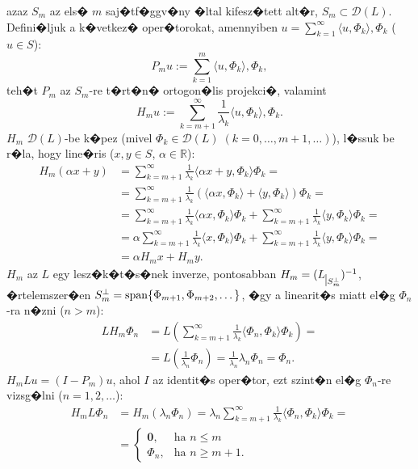 azaz $S_m$ az els� $m$ saj�tf�ggv�ny �ltal kifesz�tett alt�r, $S_m \subset \mathcal{D}(L)$. Defini�ljuk a k�vetkez� oper�torokat, amennyiben $u = \sum_{k = 1}^\infty \langle u, \Phi_k \rangle, \Phi_k$ ($u \in S$):
\begin{equation*}
P_m u := \sum_{k = 1}^m \langle u, \Phi_k \rangle, \Phi_k,
\end{equation*}
teh�t $P_m$ az $S_m$-re t�rt�n� ortogon�lis projekci�, valamint
\begin{equation*}
H_m u := \sum_{k = m + 1}^\infty \frac{1}{\lambda_k} \langle u, \Phi_k \rangle, \Phi_k.
\end{equation*}
$H_m$ $\mathcal{D}(L)$-be k�pez (mivel $\Phi_k \in \mathcal{D}(L) \; (k = 0, \dots, m+1, \dots)$), l�ssuk be r�la, hogy line�ris ($x, y \in S$, $\alpha \in \mathbb{R}$):
\begin{align*}
H_m(\alpha x + y) &= \sum_{k = m+1}^\infty \frac{1}{\lambda_k} \langle \alpha x + y, \Phi_k \rangle \Phi_k = \\
 &= \sum_{k = m+1}^\infty \frac{1}{\lambda_k} ( \langle \alpha x, \Phi_k \rangle + \langle y, \Phi_k \rangle ) \Phi_k = \\
 &= \sum_{k = m+1}^\infty \frac{1}{\lambda_k} \langle \alpha x, \Phi_k \rangle \Phi_k + \sum_{k = m+1}^\infty \frac{1}{\lambda_k} \langle y, \Phi_k \rangle \Phi_k = \\
 &= \alpha \sum_{k = m+1}^\infty \frac{1}{\lambda_k} \langle x, \Phi_k \rangle \Phi_k + \sum_{k = m+1}^\infty \frac{1}{\lambda_k} \langle y, \Phi_k \rangle \Phi_k = \\
 &= \alpha H_m x + H_m y.
\end{align*}
$H_m$ az $L$ egy lesz�k�t�s�nek inverze, pontosabban $H_m = (L_{\mkern 1mu \vrule height 2ex\mkern2mu S_m^\perp})^{-1}$, �rtelemszer�en $S_m^\perp = \mathop{\mathrm{span}} \{ \Phi_{m+1}, \Phi_{m+2}, \dots \}$, �gy a linearit�s miatt el�g $\Phi_n$-ra n�zni ($n > m$):
\begin{align*}
L H_m \Phi_n &= L \left( \sum_{k = m+1}^\infty \frac{1}{\lambda_k} \langle \Phi_n, \Phi_k \rangle \Phi_k \right) = \\
 &= L \left( \frac{1}{\lambda_n} \Phi_n \right) = \frac{1}{\lambda_n} \lambda_n \Phi_n = \Phi_n.
\end{align*}
$H_m L u = (I - P_m)u$, ahol $I$ az identit�s oper�tor, ezt szint�n el�g $\Phi_n$-re vizsg�lni ($n = 1, 2, \dots$):
\begin{align*}
H_m L \Phi_n &= H_m (\lambda_n \Phi_n) = \lambda_n \sum_{k = m+1}^\infty \frac{1}{\lambda_k} \langle \Phi_n, \Phi_k \rangle \Phi_k = \\
 &=
	\begin{cases}
		\mathbf{0}, &\text{ha } n \leq m \\
		\Phi_n, &\text{ha } n \geq m + 1.
	\end{cases}
\end{align*}
